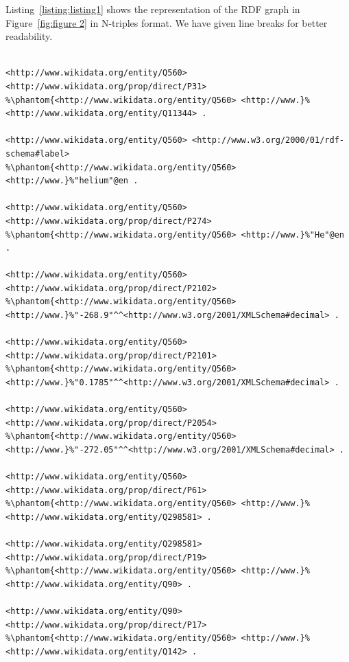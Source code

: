 \documentclass[12 pt, a4paper]{report}
\theoremstyle{definition}
\begin{document}
Listing~\ref{listing:listing1} shows the representation of the RDF graph in Figure~\ref{fig:figure 2} in N-triples format. We have given line breaks for better readability.

\begin{minipage}{\linewidth}
\begin{lstlisting}[columns=fullflexible, label=listing:listing1, caption={RDF graph represented in N-triples syntax}]

<http://www.wikidata.org/entity/Q560> <http://www.wikidata.org/prop/direct/P31> 
%\phantom{<http://www.wikidata.org/entity/Q560> <http://www.}%<http://www.wikidata.org/entity/Q11344> .

<http://www.wikidata.org/entity/Q560> <http://www.w3.org/2000/01/rdf-schema#label> 
%\phantom{<http://www.wikidata.org/entity/Q560> <http://www.}%"helium"@en .

<http://www.wikidata.org/entity/Q560> <http://www.wikidata.org/prop/direct/P274> 
%\phantom{<http://www.wikidata.org/entity/Q560> <http://www.}%"He"@en .

<http://www.wikidata.org/entity/Q560>  <http://www.wikidata.org/prop/direct/P2102> 
%\phantom{<http://www.wikidata.org/entity/Q560> <http://www.}%"-268.9"^^<http://www.w3.org/2001/XMLSchema#decimal> .

<http://www.wikidata.org/entity/Q560> <http://www.wikidata.org/prop/direct/P2101> 
%\phantom{<http://www.wikidata.org/entity/Q560> <http://www.}%"0.1785"^^<http://www.w3.org/2001/XMLSchema#decimal> .

<http://www.wikidata.org/entity/Q560> <http://www.wikidata.org/prop/direct/P2054> 
%\phantom{<http://www.wikidata.org/entity/Q560> <http://www.}%"-272.05"^^<http://www.w3.org/2001/XMLSchema#decimal> .

<http://www.wikidata.org/entity/Q560> <http://www.wikidata.org/prop/direct/P61> 
%\phantom{<http://www.wikidata.org/entity/Q560> <http://www.}%<http://www.wikidata.org/entity/Q298581> .

<http://www.wikidata.org/entity/Q298581> <http://www.wikidata.org/prop/direct/P19> 
%\phantom{<http://www.wikidata.org/entity/Q560> <http://www.}%<http://www.wikidata.org/entity/Q90> .

<http://www.wikidata.org/entity/Q90> <http://www.wikidata.org/prop/direct/P17> 
%\phantom{<http://www.wikidata.org/entity/Q560> <http://www.}%<http://www.wikidata.org/entity/Q142> . 

\end{lstlisting}
\end{minipage}
\end{document}
